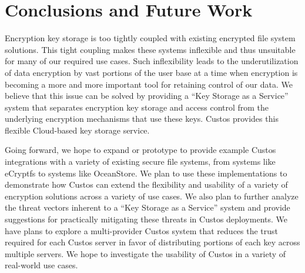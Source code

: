 \section{Conclusions and Future Work}
\label{sec:conclusion}

Encryption key storage is too tightly coupled with existing encrypted
file system solutions. This tight coupling makes these systems
inflexible and thus unsuitable for many of our required use cases.
Such inflexibility leads to the underutilization of data encryption by
vast portions of the user base at a time when encryption is becoming a
more and more important tool for retaining control of our data. We
believe that this issue can be solved by providing a ``Key Storage as
a Service'' system that separates encryption key storage and access
control from the underlying encryption mechanisms that use these
keys. Custos provides this flexible Cloud-based key storage service.

Going forward, we hope to expand or prototype to provide example
Custos integrations with a variety of existing secure file systems,
from systems like eCryptfs to systems like OceanStore. We plan to use
these implementations to demonstrate how Custos can extend the
flexibility and usability of a variety of encryption solutions across
a variety of use cases. We also plan to further analyze the threat
vectors inherent to a ``Key Storage as a Service'' system and provide
suggestions for practically mitigating these threats in Custos
deployments. We have plans to explore a multi-provider Custos system
that reduces the trust required for each Custos server in favor of
distributing portions of each key across multiple servers. We hope to
investigate the usability of Custos in a variety of real-world use
cases.

